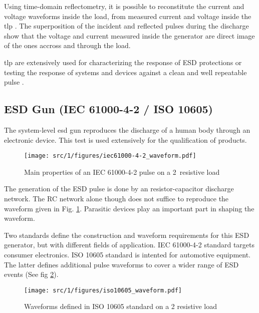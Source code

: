 Using time-domain reflectometry, it is possible to reconstitute the current and voltage waveforms inside the load,
from measured current and voltage inside the \gls{tlp} \cite{TLP}.
The superposition of the incident and reflected pulses during the discharge show that the voltage and current
measured inside the generator are direct image of the ones accross and through the load.

\gls{tlp} are extensively used for characterizing the response of ESD protections \cite{TLPforESDProtectionCz}
or testing the response of systems and devices against a clean and well repeatable pulse \cite{TLPthroubleshooting, LacrampeTransientImmunity}.


\subsection{ESD Gun (IEC 61000-4-2 / ISO 10605)}

The system-level \gls{esd} gun reproduces the discharge of a human body through an electronic device.
This test is used extensively for the qualification of products.

\begin{figure}[!h]
  \centering
  \texttt{[image: src/1/figures/iec61000-4-2\_waveform.pdf]}
  \caption{Main properties of an IEC 61000-4-2 pulse on a 2\textOmega\ resistive load}
  \label{iec_pulse}
\end{figure}

The generation of the ESD pulse is done by an resistor-capacitor discharge network.
The RC network alone though does not suffice to reproduce the waveform given in Fig. \ref{iec_pulse}.
Parasitic devices play an important part in shaping the waveform.

Two standards define the construction and waveform requirements for this ESD generator, but with different fields of application.
IEC 61000-4-2\cite{iec61000-4-2} standard targets consumer electronics.
ISO 10605\cite{iso10605} standard is intented for automotive equipment.
The latter defines additional pulse waveforms to cover a wider range of ESD events (See fig \ref{iso_pulse}).

\begin{figure}[!h]
  \centering
  \texttt{[image: src/1/figures/iso10605\_waveform.pdf]}
  \caption{Waveforms defined in ISO 10605 standard on a 2\textOmega{} resistive load}
  \label{iso_pulse}
\end{figure}

